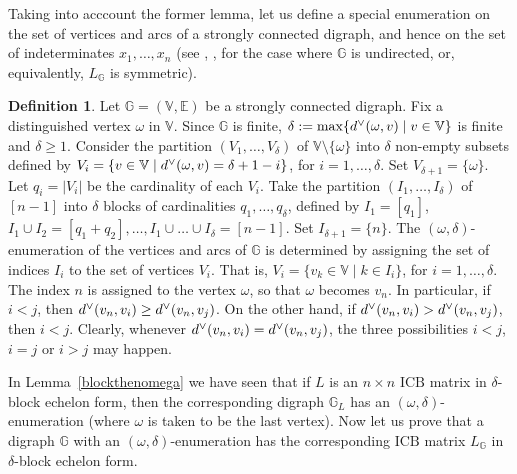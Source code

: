 \documentclass[10pt]{amsart}
\newcommand{\mbg}{\mbox{$\mathbb{G}$}}
\newcommand{\mbv}{\mbox{$\mathbb{V}$}}
\newcommand{\mbe}{\mbox{$\mathbb{E}$}}
\newcommand{\icb}{\mbox{$\mathrm{ICB}$}}
\newcommand{\ud}{\mbox{${\rm d}^\vee$}}
\theoremstyle{definition}
\newtheorem{definition}[cdrthm]{Definition}
\theoremstyle{remark}
\begin{document}
 Taking into acccount the former lemma, let us define a
special enumeration on the set of vertices and arcs of a strongly
connected digraph, and hence on the set of indeterminates $x_1,\ldots
,x_n$ (see \cite[p.~7]{crs}, \cite[Section~2.2.3]{mos}, for the case
where $\mbg$ is undirected, or, equivalently, $L_{\mathbb{G}}$ is
symmetric).

\begin{definition}\label{def-omega}
Let $\mbg=(\mbv,\mbe)$ be a strongly connected digraph.  Fix a
distinguished vertex $\omega$ in $\mbv$. Since $\mbg$ is finite,
$\delta:=\max\{\ud(\omega,v)\mid v\in \mbv\}$ is finite and
$\delta\geq 1$. Consider the partition $(V_1,\ldots ,V_{\delta})$ of
$\mbv\setminus\{\omega\}$ into $\delta$ non-empty subsets defined by
$V_i=\{v\in \mbv\mid \ud(\omega,v)=\delta+1-i\}$, for $i=1,\ldots
,\delta$. Set $V_{\delta+1}=\{\omega\}$.  Let $q_i=\lvert V_i\rvert$
be the cardinality of each $V_i$. Take the partition $(I_1,\ldots
,I_\delta)$ of $[n-1]$ into $\delta$ blocks of cardinalities
$q_1,\ldots ,q_\delta$, defined by $I_1=[q_1]$, $I_1\cup
I_2=[q_1+q_2],\ldots ,I_1\cup\ldots\cup I_\delta=[n-1]$. Set
$I_{\delta+1}=\{n\}$. The $(\omega,\delta)$-enumeration of the
vertices and arcs of $\mbg$ is determined by assigning the set of
indices $I_i$ to the set of vertices $V_i$.  That is, $V_i=\{v_k\in
\mbv\mid k\in I_i\}$, for $i=1,\ldots ,\delta$. The index $n$ is
assigned to the vertex $\omega$, so that $\omega$ becomes $v_n$. In
particular, if $i<j$, then $\ud(v_n,v_i)\geq \ud(v_n,v_j)$. On the
other hand, if $\ud(v_n,v_i)>\ud(v_n,v_j)$, then $i<j$. Clearly,
whenever $\ud(v_n,v_i)=\ud(v_n,v_j)$, the three possibilities $i<j$,
$i=j$ or $i>j$ may happen.
\end{definition}

In Lemma~\ref{blockthenomega} we have seen that if $L$ is an $n\times
n$ $\icb$ matrix in $\delta$-block echelon form, then the
corresponding digraph $\mbg_L$ has an $(\omega,\delta)$-enumeration
(where $\omega$ is taken to be the last vertex). Now let us prove that
a digraph $\mbg$ with an $(\omega,\delta)$-enumeration has the
corresponding $\icb$ matrix $L_{\mathbb{G}}$ in $\delta$-block echelon
form.
\end{document}
